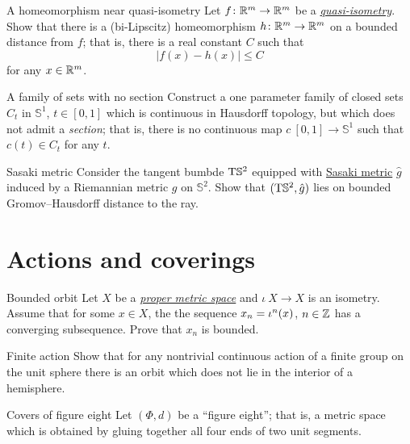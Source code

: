 \documentclass[twoside]{book}
\begin{document}
{\begin{pr}{\thm}{A homeomorphism near quasi-isometry}\label{hom-near-QI} 
Let $f\colon\mathbb{R}^m\to\mathbb{R}^m$ be a \hyperref[Quasi-isometry]{\emph{quasi-isometry}}.
Show that there is a (bi-Lipscitz) homeomorphism 
$h\colon\mathbb{R}^m\to\mathbb{R}^m$ on a bounded distance from $f$;
that is, there is a real constant $C$ such that
$$|f(x)-h(x)|\le C$$
for any $x\in\mathbb{R}^m$.
\end{pr}

\begin{pr}{}{A family of sets with no section}\label{hausdorff-section} 
Construct a one parameter family of closed sets $C_t$ in $\mathbb{S}^1$, $t\in [0,1]$
which is continuous in Hausdorff topology, 
but which does not admit a \emph{section};
that is, there is no continuous 
map $c\:[0,1]\to \mathbb{S}^1$ such that $c(t)\in C_t$ for any $t$.
\end{pr}

\begin{pr}{}{Sasaki metric}\label{pr:Sasaki metric}
Consider the tangent bumbde $\mathrm{T} \mathbb{S}^2$ 
equipped with \hyperref[Sasaki metric]{Sasaki metric} $\hat g$ induced by a Riemannian metric $g$ on $\mathbb{S}^2$.
Show that $(\mathrm{T} \mathbb{S}^2, \hat g)$ lies on bounded Gromov--Hausdorff distance to the ray.
\end{pr}




\chapter{Actions and coverings}


\begin{pr}{}{Bounded orbit}\label{Bounded orbit} Let $X$ be a 
\hyperref[Proper metric space]{\emph{proper metric space}} 
and $\iota\:X\to X$ is an isometry.
Assume that for some $x\in X$, the the sequence $x_n\z=\iota^n(x)$, $n\in\mathbb{Z}$ has a converging subsequence.
Prove that $x_n$ is bounded.
\end{pr}

\begin{pr}{}{Finite action}\label{Finite action}
Show that for any nontrivial continuous action of a finite group on the unit sphere
there is an orbit which does not lie in the interior of a hemisphere.
\end{pr}


\begin{pr}{}{Covers of figure eight}\label{figure-eight-1}
Let $(\Phi,d)$ be a ``figure eight''; 
that is,
a metric space which
is obtained by gluing together all four ends of two unit segments.


\end{pr}}
\end{document}
